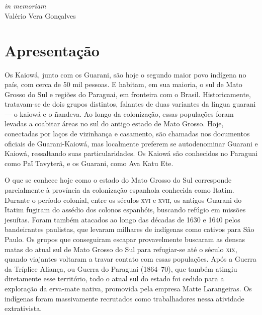\chapter*{}
\thispagestyle{empty}

\vfill
\begin{flushright}
\small
\textit{in memoriam}\\
Valério Vera Gonçalves
\end{flushright}

\chapter{Apresentação}

Os Kaiowá, junto com os Guarani, são hoje o segundo maior povo indígena
no país, com cerca de 50 mil pessoas. E habitam, em sua maioria, o sul
de Mato Grosso do Sul e regiões do Paraguai, em fronteira com o Brasil.
Historicamente, tratavam-se de dois grupos distintos, falantes de duas
variantes da língua guarani --- o kaiowá e o ñandeva. Ao longo da
colonização, essas populações foram levadas a coabitar áreas no
sul do antigo estado de Mato Grosso. Hoje, conectadas por laços de
vizinhança e casamento, são chamadas nos documentos oficiais de
Guarani-Kaiowá, mas localmente preferem se autodenominar Guarani e
Kaiowá, ressaltando suas particularidades. Os Kaiowá são conhecidos no
Paraguai como Paῖ Tavyterã, e os Guarani, como Ava Katu Ete.

O que se conhece hoje como o estado do Mato Grosso do Sul corresponde
parcialmente à província da colonização espanhola conhecida como Itatim.
Durante o período colonial, entre os séculos \textsc{xvi} e \textsc{xvii}, os antigos
Guarani do Itatim fugiram do assédio dos colonos espanhóis, buscando
refúgio em missões jesuítas. Foram também atacados ao longo das décadas
de 1630 e 1640 pelos bandeirantes paulistas, que levaram milhares de indígenas como cativos para São Paulo. Os grupos que conseguiram escapar
provavelmente buscaram as densas matas do atual sul de Mato Grosso do
Sul para refugiar-se até o século \textsc{xix}, quando viajantes voltaram a
travar contato com essas populações. Após a Guerra da Tríplice Aliança,
ou Guerra do Paraguai (1864--70), que também atingiu diretamente esse
território, todo o atual sul do estado foi cedido para a exploração da
erva-mate nativa, promovida pela empresa Matte Larangeiras. Os indígenas
foram massivamente recrutados como trabalhadores nessa atividade
extrativista.

